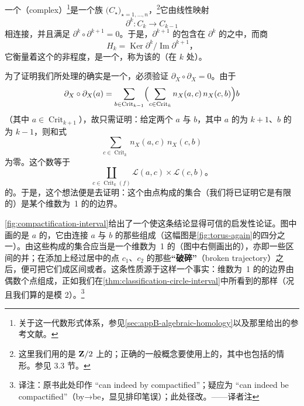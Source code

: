 一个\textbf{\trComplex}（complex）\footnote{关于这一代数形式体系，参见\cref{sec:appB-algebraic-homology}以及那里给出的参考文献。}是一个\trVectorSpace{}族 $\bigl(C_{\star}\bigr)_{\star=1,\dotsc,n}$，\footnote{这里我们用的是 $\mathbf{Z}/2$ 上的\trVectorSpace；正确的一般概念要使用\trCommutativeRing{}上的\trModule，其中也包括\trAbelianGroup{}的情形。参见 3.3 节。}它由线性映射
\[
\partial^k\colon C_k\longrightarrow C_{k-1}
\]
相连接，并且满足 $\partial^k\circ\partial^{k+1}=0$。于是，$\partial^{k+1}$ 的\trImage{}包含在 $\partial^k$ 的\trKernel{}之中，而商
\[
H_k=\operatorname{Ker}\partial^k/\operatorname{Im}\partial^{k+1}\text{，}
\]
它衡量着这个\trComplex{}的非\trExact{}程度，是一个\trVectorSpace，称为该\trComplex{}的\trHomology{}（在\trDegree{} $k$ 处）。

为了证明我们所处理的确实是一个\trComplex，必须验证 $\partial_X\circ\partial_X=0$。由于
\[
\partial_X\circ\partial_X(a)
  =\sum_{b\in\operatorname{Crit}_{k-1}}
   \Bigl(\sum_{c\in\operatorname{Crit}_k} n_X(a,c)\,n_X(c,b)\Bigr)b
\]
（其中 $a\in\operatorname{Crit}_{k+1}$），故只需证明：给定两个\trCriticalPoint{} $a$ 与 $b$，其中 $a$ 的\trIndex{}为 $k+1$、$b$ 的\trIndex{}为 $k-1$，则和式
\[
\sum_{c\in\operatorname{Crit}_k} n_X(a,c)\,n_X(c,b)
\]
为零。这个数等于\trDisjointUnion
\[
\coprod_{c\in\operatorname{Crit}_k(f)}\mathcal{L}(a,c)\times\mathcal{L}(c,b)\text{。}
\]
的\trCardinality。于是，这个想法便是去证明：这个由点构成的集合（我们将已证明它是有限的）是某个维数为~1 的\trManifold{}的边界。

\cref{fig:compactification-interval}给出了一个使这条结论显得可信的启发性论证。图中画的是 $a$ 的\trUnstableManifold，它由连接 $a$ 与 $b$ 的那些\trTrajectory{}组成（这幅图是\cref{fig:torus-again}的四分之一）。由这些\trTrajectory{}构成的集合应当是一个维数为~1 的\trManifold{}（图中右侧画出的），亦即一些\trOpen{}区间的并；在添加上经过\trIndex{}居中的点 $c_1$、$c_2$ 的那些\textbf{“破碎”\trTrajectory}（broken trajectory）{}之后，便可把它们\trCompactification{}成\trClosed{}区间或者\trCircle。这条性质源于这样一个事实：维数为~1 的\trManifoldWithBoundary{}的边界由偶数个点组成，正如我们在\cref{thm:classification-circle-interval}中所看到的那样（况且我们算的是模 2）。\footnote{译注：原书此处印作 “can indeed by compactified”；疑应为 “can indeed be compactified”（by→be，显见排印笔误）；此处径改。——译者注}

